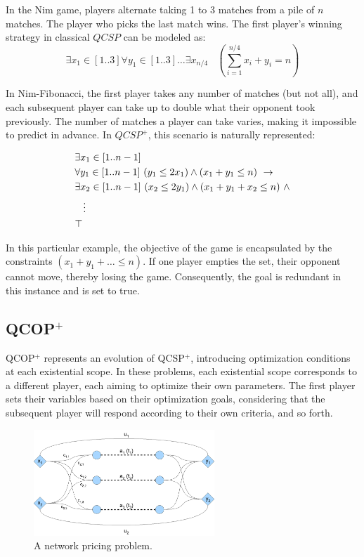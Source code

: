 \documentclass{article}
\begin{document}
In the Nim game, players alternate taking 1 to 3 matches from a pile of $n$ matches. The player who picks the last match wins. The first player's winning strategy in classical $QCSP$ can be modeled as:
$$\exists x_1 \in [1..3] \forall y_1 \in [1..3] \ldots \exists x_{n/4} ~~~~ (\sum_{i=1}^{n/4} x_i + y_i = n)$$

In Nim-Fibonacci, the first player takes any number of matches (but not all), and each subsequent player can take up to double what their opponent took previously. The number of matches a player can take varies, making it impossible to predict in advance. In $QCSP^+$, this scenario is naturally represented:

\begin{align*}
    &\exists x_1 \in [1.. n-1]\\
    &\forall y_1 \in [1..n-1] ~(y_1\leq 2x_1) \wedge (x_1+y_1 \leq n) ~ \rightarrow \\
    &\exists x_2 \in [1..n-1] ~ (x_2\leq2y_1) \wedge (x_1+y_1+x_2 \leq n)  ~ \wedge \\
    &\hspace{3mm}\vdots\\
    &\top
\end{align*}

In this particular example, the objective of the game is encapsulated by the constraints $(x_1+y_1+\ldots \leq n)$. If one player empties the set, their opponent cannot move, thereby losing the game. Consequently, the goal is redundant in this instance and is set to true.


\subsection{QCOP$^+$}
QCOP$^+$ represents an evolution of QCSP$^+$, introducing optimization conditions at each existential scope. In these problems, each existential scope corresponds to a different player, each aiming to optimize their own parameters. The first player sets their variables based on their optimization goals, considering that the subsequent player will respond according to their own criteria, and so forth.

\begin{figure}[b]
\centerline{\includegraphics[height=4cm]{network.pdf}}
\caption{A network pricing problem.} \label{fig-network}
\end{figure}
\end{document}

